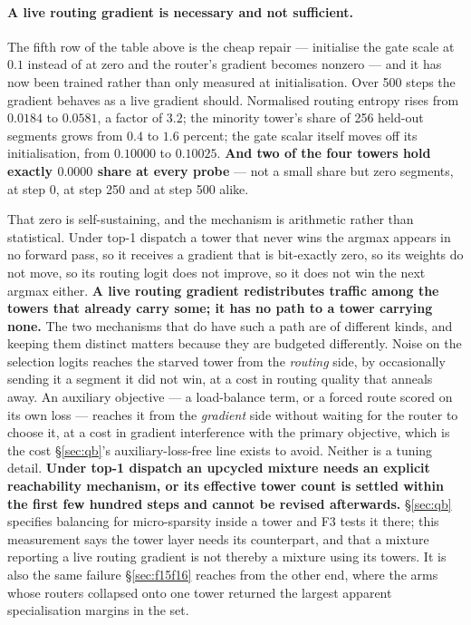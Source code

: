 \documentclass[11pt]{article}
\begin{document}
\paragraph{A live routing gradient is necessary and not sufficient.} The fifth row of the table above is the cheap repair --- initialise the gate scale at $0.1$ instead of at zero and the router's gradient becomes nonzero --- and it has now been trained rather than only measured at initialisation. Over 500 steps the gradient behaves as a live gradient should. Normalised routing entropy rises from $0.0184$ to $0.0581$, a factor of $3.2$; the minority tower's share of 256 held-out segments grows from $0.4$ to $1.6$ percent; the gate scalar itself moves off its initialisation, from $0.10000$ to $0.10025$. \textbf{And two of the four towers hold exactly $0.0000$ share at every probe} --- not a small share but zero segments, at step 0, at step 250 and at step 500 alike.

That zero is self-sustaining, and the mechanism is arithmetic rather than statistical. Under top-1 dispatch a tower that never wins the argmax appears in no forward pass, so it receives a gradient that is bit-exactly zero, so its weights do not move, so its routing logit does not improve, so it does not win the next argmax either. \textbf{A live routing gradient redistributes traffic among the towers that already carry some; it has no path to a tower carrying none.} The two mechanisms that do have such a path are of different kinds, and keeping them distinct matters because they are budgeted differently. Noise on the selection logits reaches the starved tower from the \emph{routing} side, by occasionally sending it a segment it did not win, at a cost in routing quality that anneals away. An auxiliary objective --- a load-balance term, or a forced route scored on its own loss --- reaches it from the \emph{gradient} side without waiting for the router to choose it, at a cost in gradient interference with the primary objective, which is the cost \S\ref{sec:qb}'s auxiliary-loss-free line exists to avoid. Neither is a tuning detail. \textbf{Under top-1 dispatch an upcycled mixture needs an explicit reachability mechanism, or its effective tower count is settled within the first few hundred steps and cannot be revised afterwards.} \S\ref{sec:qb} specifies balancing for micro-sparsity inside a tower and F3 tests it there; this measurement says the tower layer needs its counterpart, and that a mixture reporting a live routing gradient is not thereby a mixture using its towers. It is also the same failure \S\ref{sec:f15f16} reaches from the other end, where the arms whose routers collapsed onto one tower returned the largest apparent specialisation margins in the set.
\end{document}
